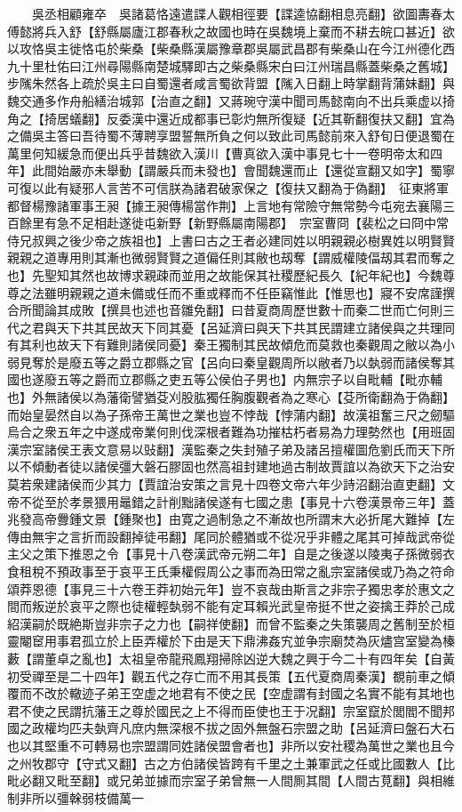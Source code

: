 　　吳丞相顧雍卒　吳諸葛恪遠遣諜人觀相徑要【諜逵協翻相息亮翻】欲圖夀春太傅懿將兵入舒【舒縣屬廬江郡春秋之故國也時在吳魏境上棄而不耕去皖口甚近】欲以攻恪吳主徙恪屯於柴桑【柴桑縣漢屬豫章郡吳屬武昌郡有柴桑山在今江州德化西九十里杜佑曰江州尋陽縣南楚城驛即古之柴桑縣宋白曰江州瑞昌縣蓋柴桑之舊城】　步隲朱然各上疏於吳主曰自蜀還者咸言蜀欲背盟【隲入日翻上時掌翻背蒲妹翻】與魏交通多作舟船繕治城郭【治直之翻】又蔣琬守漢中聞司馬懿南向不出兵乘虚以掎角之【掎居蟻翻】反委漢中還近成都事已彰灼無所復疑【近其靳翻復扶又翻】宜為之備吳主答曰吾待蜀不薄聘享盟誓無所負之何以致此司馬懿前來入舒旬日便退蜀在萬里何知緩急而便出兵乎昔魏欲入漢川【曹真欲入漢中事見七十一卷明帝太和四年】此間始嚴亦未舉動【謂嚴兵而未發也】會聞魏還而止【還從宣翻又如字】蜀寧可復以此有疑邪人言苦不可信朕為諸君破家保之【復扶又翻為于偽翻】　征東將軍都督楊豫諸軍事王昶【據王昶傳楊當作荆】上言地有常險守無常勢今屯宛去襄陽三百餘里有急不足相赴遂徙屯新野【新野縣屬南陽郡】　宗室曹冏【裴松之曰冏中常侍兄叔興之後少帝之族祖也】上書曰古之王者必建同姓以明親親必樹異姓以明賢賢親親之道專用則其漸也微弱賢賢之道偏任則其敝也刼奪【謂威權陵偪刼其君而奪之也】先聖知其然也故博求親疎而並用之故能保其社稷歷紀長久【紀年紀也】今魏尊尊之法雖明親親之道未備或任而不重或釋而不任臣竊惟此【惟思也】寢不安席謹撰合所聞論其成敗【撰具也述也音雛免翻】曰昔夏商周歷世數十而秦二世而亡何則三代之君與天下共其民故天下同其憂【呂延濟曰與天下共其民謂建立諸侯與之共理同有其利也故天下有難則諸侯同憂】秦王獨制其民故傾危而莫救也秦觀周之敝以為小弱見奪於是廢五等之爵立郡縣之官【呂向曰秦皇觀周所以敝者乃以埶弱而諸侯奪其國也遂廢五等之爵而立郡縣之吏五等公侯伯子男也】内無宗子以自毗輔【毗亦輔也】外無諸侯以為藩衛譬猶芟刈股肱獨任胸腹觀者為之寒心【芟所衛翻為于偽翻】而始皇晏然自以為子孫帝王萬世之業也豈不悖哉【悖蒲内翻】故漢祖奮三尺之劒驅烏合之衆五年之中遂成帝業何則伐深根者難為功摧枯朽者易為力理勢然也【用班固漢宗室諸侯王表文意易以䜴翻】漢監秦之失封殖子弟及諸呂擅權圖危劉氏而天下所以不傾動者徒以諸侯彊大磐石膠固也然高祖封建地過古制故賈誼以為欲天下之治安莫若衆建諸侯而少其力【賈誼治安策之言見十四卷文帝六年少詩沼翻治直吏翻】文帝不從至於孝景猥用鼂錯之計削黜諸侯遂有七國之患【事見十六卷漢景帝三年】蓋兆發高帝釁鍾文景【鍾聚也】由寛之過制急之不漸故也所謂末大必折尾大難掉【左傳由無宇之言折而設翻掉徒弔翻】尾同於體猶或不從况乎非體之尾其可掉哉武帝從主父之策下推恩之令【事見十八卷漢武帝元朔二年】自是之後遂以陵夷子孫微弱衣食租稅不預政事至于哀平王氏秉權假周公之事而為田常之亂宗室諸侯或乃為之符命頌莽恩德【事見三十六卷王莽初始元年】豈不哀哉由斯言之非宗子獨忠孝於惠文之間而叛逆於哀平之際也徒權輕埶弱不能有定耳賴光武皇帝挺不世之姿擒王莽於己成紹漢嗣於既絶斯豈非宗子之力也【嗣祥使翻】而曾不監秦之失策襲周之舊制至於桓靈閹䆠用事君孤立於上臣弄權於下由是天下鼎沸姦宄並争宗廟焚為灰燼宫室變為榛藪【謂董卓之亂也】太祖皇帝龍飛鳳翔掃除凶逆大魏之興于今二十有四年矣【自黃初受禪至是二十四年】觀五代之存亡而不用其長策【五代夏商周秦漢】覩前車之傾覆而不改於轍迹子弟王空虚之地君有不使之民【空虚謂有封國之名實不能有其地也君不使之民謂抗藩王之尊於國民之上不得而臣使也王于况翻】宗室竄於閭閻不聞邦國之政權均匹夫埶齊凡庶内無深根不拔之固外無盤石宗盟之助【呂延濟曰盤石大石也以其堅重不可轉易也宗盟謂同姓諸侯盟會者也】非所以安社稷為萬世之業也且今之州牧郡守【守式又翻】古之方伯諸侯皆跨有千里之土兼軍武之任或比國數人【比毗必翻又毗至翻】或兄弟並據而宗室子弟曾無一人間厠其間【人間古莧翻】與相維制非所以彊榦弱枝備萬一